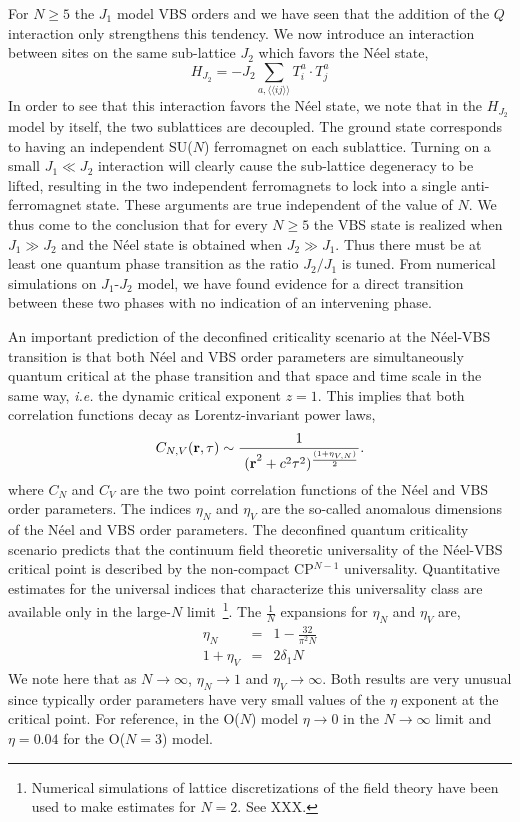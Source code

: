 \documentclass[range]{ar2e}
\begin{document}
For $N\geq 5$ the $J_1$ model VBS orders and we have seen that the
addition of the $Q$ interaction only strengthens this tendency. We now
introduce an interaction between sites on the same sub-lattice $J_2$ which favors the N\'eel state,
\begin{equation}
H_{J_2}= -J_2 \sum_{a,\langle\langle ij\rangle\rangle} T^a_i\cdot T^{a}_j
\end{equation}
In order to see that this interaction favors the N\'eel state, we note
that in the $H_{J_2}$ model by itself, the two sublattices are
decoupled. The ground state corresponds to having an independent SU($N$) ferromagnet on
each sublattice. Turning on a small $J_1\ll J_2$ interaction will clearly cause
the sub-lattice degeneracy to be lifted, resulting in the
two independent ferromagnets to lock into a single
anti-ferromagnet state. These arguments are true independent of the
value of $N$. We thus
come to the conclusion that for every $N\geq 5$ the VBS state is
realized when $J_1\gg J_2$ and the N\'eel state is obtained when $J_2
\gg J_1$. Thus there must be at least one quantum phase transition as
the ratio
$J_2/J_1$ is tuned. From numerical simulations on $J_1$-$J_2$ model, we have found
evidence for a direct transition between these two phases with no
indication of an intervening phase. 

An important prediction of the deconfined criticality scenario at the
N\'eel-VBS transition is that both N\'eel and VBS order parameters are
simultaneously quantum critical at the phase transition and that space
and time scale in the same way, {\em i.e.} the dynamic critical exponent $z=1$. This implies
that both correlation functions decay as Lorentz-invariant power laws,
\begin{equation}
\label{eq:expdef}
C_{N,V} ({\bf r},\tau) \sim  \frac{1}{~{(\bf r}^2+c^2\tau^2)^{\frac{(1+\eta_{V,N})}{2}}}.
\end{equation}
 where $C_N$ and $C_V$ are the two point correlation functions of the
 N\'eel and VBS order parameters. The indices $\eta_N$ and $\eta_V$
 are the so-called anomalous dimensions of the N\'eel and VBS order
 parameters. The deconfined quantum criticality scenario predicts that
 the continuum field theoretic universality of the N\'eel-VBS critical
 point is described by the non-compact CP$^{N-1}$ universality. Quantitative
 estimates for the universal indices that characterize this
 universality class are available only in the large-$N$
 limit~\footnote{Numerical simulations of lattice discretizations of
   the field theory have been used to make estimates for $N=2$. See
   XXX.}. The $\frac{1}{N}$ expansions for $\eta_N$ and $\eta_V$ are,
\begin{eqnarray}
\label{eq:oneonN}
\eta_N &=& 1 - \frac{32}{\pi^2N}\nonumber\\
1+\eta_V &=& 2 \delta_1 N
\end{eqnarray}
We note here that as $N\rightarrow\infty$, $\eta_N \rightarrow 1$ and
$\eta_V\rightarrow \infty$. Both results are very unusual since
typically order parameters have very small values of the $\eta$
exponent at the critical point. For reference, in the O($N$) model $\eta\rightarrow
0$ in the $N\rightarrow\infty$ limit and $\eta=0.04$ for the O($N=3$) model.
\end{document}
